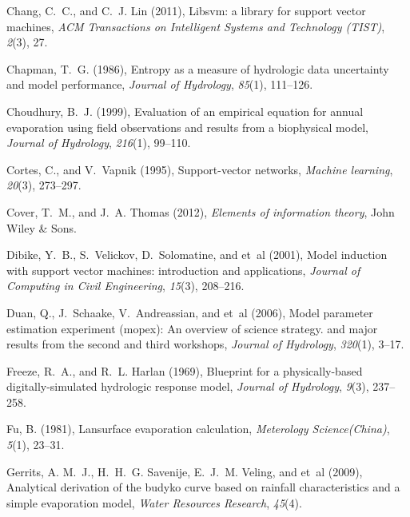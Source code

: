 \documentclass[draft,wrr]{AGUTeX}
\begin{document}
\begin{article}
\begin{thebibliography}{59}
Chang, C.~C., and C.~J. Lin (2011), Libsvm: a library for support vector
  machines, \textit{ACM Transactions on Intelligent Systems and Technology
  (TIST)}, \textit{2}(3), 27.

Chapman, T.~G. (1986), Entropy as a measure of hydrologic data uncertainty and
  model performance, \textit{Journal of Hydrology}, \textit{85}(1), 111--126.

Choudhury, B.~J. (1999), Evaluation of an empirical equation for annual
  evaporation using field observations and results from a biophysical model,
  \textit{Journal of Hydrology}, \textit{216}(1), 99--110.

Cortes, C., and V.~Vapnik (1995), Support-vector networks, \textit{Machine
  learning}, \textit{20}(3), 273--297.

Cover, T.~M., and J.~A. Thomas (2012), \textit{Elements of information theory},
  John Wiley \& Sons.

Dibike, Y.~B., S.~Velickov, D.~Solomatine, and et~al (2001), Model induction
  with support vector machines: introduction and applications, \textit{Journal
  of Computing in Civil Engineering}, \textit{15}(3), 208--216.

Duan, Q., J.~Schaake, V.~Andreassian, and et~al (2006), Model parameter
  estimation experiment (mopex): An overview of science strategy. and major
  results from the second and third workshops, \textit{Journal of Hydrology},
  \textit{320}(1), 3--17.

Freeze, R.~A., and R.~L. Harlan (1969), Blueprint for a physically-based
  digitally-simulated hydrologic response model, \textit{Journal of Hydrology},
  \textit{9}(3), 237--258.

Fu, B. (1981), Lansurface evaporation calculation, \textit{Meterology
  Science(China)}, \textit{5}(1), 23--31.

Gerrits, A. M.~J., H.~H.~G. Savenije, E.~J.~M. Veling, and et~al (2009),
  Analytical derivation of the budyko curve based on rainfall characteristics
  and a simple evaporation model, \textit{Water Resources Research},
  \textit{45}(4).


\end{thebibliography}
\end{article}
\end{document}
